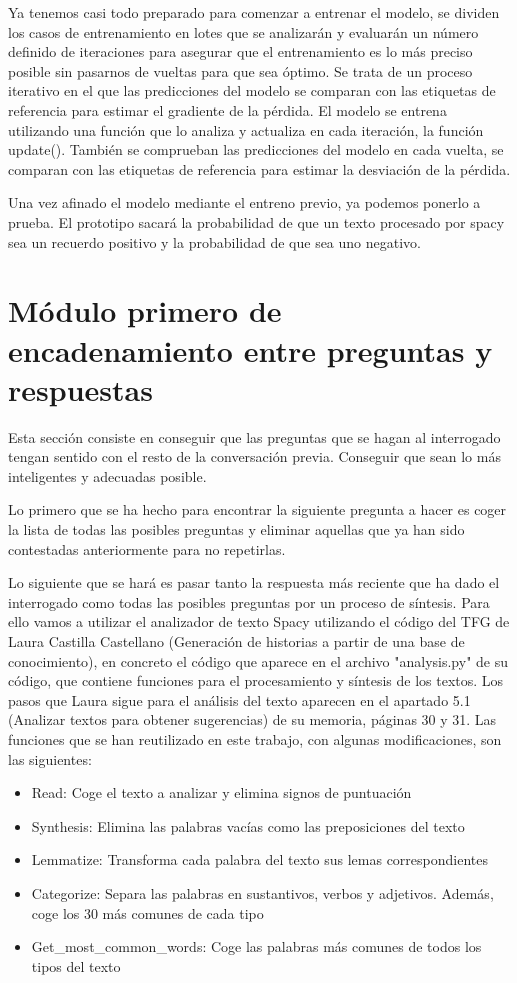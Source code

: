 Ya tenemos casi todo preparado para comenzar a entrenar el modelo, se dividen los casos de entrenamiento en lotes que se analizarán y evaluarán un número definido de iteraciones para asegurar que el entrenamiento es lo más preciso posible sin pasarnos de vueltas para que sea óptimo. Se trata de un proceso iterativo en el que las predicciones del modelo se comparan con las etiquetas de referencia para estimar el gradiente de la pérdida. El modelo se entrena utilizando una función que lo analiza y actualiza en cada iteración, la función update(). También se comprueban las predicciones del modelo en cada vuelta, se comparan con las etiquetas de referencia para estimar la desviación de la pérdida.

Una vez afinado el modelo mediante el entreno previo, ya podemos ponerlo a prueba. El prototipo sacará la probabilidad de que un texto procesado por spacy sea un recuerdo positivo y la probabilidad de que sea uno negativo. 

\section{Módulo primero de encadenamiento entre preguntas y respuestas}
Esta sección consiste en conseguir que las preguntas que se hagan al interrogado tengan sentido con el resto de la conversación previa. Conseguir que sean lo más inteligentes y adecuadas posible. 

Lo primero que se ha hecho para encontrar la siguiente pregunta a hacer es coger la lista de todas las posibles preguntas y eliminar aquellas que ya han sido contestadas anteriormente para no repetirlas. 

Lo siguiente que se hará es pasar tanto la respuesta más reciente que ha dado el interrogado como todas las posibles preguntas por un proceso de síntesis. Para ello vamos a utilizar el analizador de texto Spacy utilizando el código del TFG de Laura Castilla Castellano (Generación de historias a partir de una base de conocimiento), en concreto el código que aparece en el archivo "analysis.py" de su código, que contiene funciones para el procesamiento y síntesis de los textos. Los pasos que Laura sigue para el análisis del texto aparecen en el apartado 5.1 (Analizar textos para obtener sugerencias) de su memoria, páginas 30 y 31. Las funciones que se han reutilizado en este trabajo, con algunas modificaciones, son las siguientes:
\begin{itemize}
	\item Read: Coge el texto a analizar y elimina signos de puntuación
	\item Synthesis: Elimina las palabras vacías como las preposiciones del texto
	\item Lemmatize: Transforma cada palabra del texto sus lemas correspondientes
	\item Categorize: Separa las palabras en sustantivos, verbos y adjetivos. Además, coge los 30 más comunes de cada tipo
	\item Get\_most\_common\_words: Coge las palabras más comunes de todos los tipos del texto
\end{itemize}

